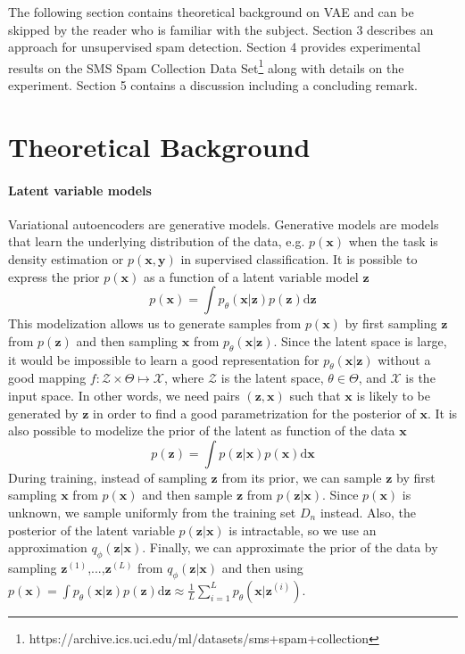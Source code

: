 \documentclass[10pt]{article}
\newcommand{\der}{\mathrm{d}}
\begin{document}
The following section contains theoretical background on VAE and can be skipped by the reader who is familiar with the subject. Section 3 describes an approach for unsupervised spam detection. Section 4 provides experimental results on the SMS Spam Collection Data Set\footnote{https://archive.ics.uci.edu/ml/datasets/sms+spam+collection} along with details on the experiment. Section 5 contains a discussion including a concluding remark.

\section{Theoretical Background}
\paragraph{Latent variable models} Variational autoencoders are generative models. Generative models are models that learn the underlying distribution of the data, e.g. $p(\mathbf{x})$ when the task is density estimation or $p(\mathbf{x}, \mathbf{y})$ in supervised classification. It is possible to express the prior $p(\mathbf{x})$ as a function of a latent variable model $\mathbf{z}$
\begin{equation}
	p(\mathbf{x}) 
	= \int p_\theta (\mathbf{x}|\mathbf{z}) p(\mathbf{z}) \der\mathbf{z}
\end{equation}
This modelization allows us to generate samples from $p(\mathbf{x})$ by first sampling $\mathbf{z}$ from $p(\mathbf{z})$ and then sampling $\mathbf{x}$ from $p_\theta(\mathbf{x}|\mathbf{z})$. Since the latent space is large, it would be impossible to learn a good representation for $p_\theta(\mathbf{x}|\mathbf{z})$ without a good mapping $f\colon \mathcal{Z}\times \Theta \mapsto \mathcal{X}$, where $\mathcal{Z}$ is the latent space, $\theta\in\Theta$, and $\mathcal{X}$ is the input space. In other words, we need pairs $(\mathbf{z}, \mathbf{x})$ such that $\mathbf{x}$ is likely to be generated by $\mathbf{z}$ in order to find a good parametrization for the posterior of $\mathbf{x}$. It is also possible to modelize the prior of the latent as function of the data $\mathbf{x}$
\begin{equation}
	p(\mathbf{z}) 
	= \int p(\mathbf{z}|\mathbf{x}) p(\mathbf{x}) \der\mathbf{x}
\end{equation}
During training, instead of sampling $\mathbf{z}$ from its prior, we can sample $\mathbf{z}$ by first sampling $\mathbf{x}$ from $p(\mathbf{x})$ and then sample $\mathbf{z}$ from $p(\mathbf{z}|\mathbf{x})$. Since $p(\mathbf{x})$ is unknown, we sample uniformly from the training set $D_n$ instead. Also, the posterior of the latent variable $p(\mathbf{z}|\mathbf{x})$ is intractable, so we use an approximation $q_\phi(\mathbf{z}|\mathbf{x})$. Finally, we can approximate the prior of the data by sampling $\mathbf{z}^{(1)}$,...,$\mathbf{z}^{(L)}$ from $q_\phi(\mathbf{z}|\mathbf{x})$ and then using $p(\mathbf{x})= \int p_\theta (\mathbf{x}|\mathbf{z}) p(\mathbf{z}) \der\mathbf{z}\approx \frac{1}{L}\sum_{i=1}^L p_\theta(\mathbf{x}|\mathbf{z}^{(i)})$.
\end{document}
